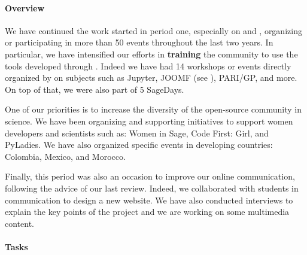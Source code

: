 \paragraph{Overview}

  We have continued the work started in period one, especially on  and
  , organizing or participating in more than 50 events throughout the last two years.
  In particular, we have intensified our efforts in \textbf{training} the community to use the tools developed through \ODK.
  Indeed we have had 14 workshops or events directly organized by \ODK on subjects such as Jupyter, JOOMF (see ), PARI/GP, and more. On top of that, we were also part of 5 SageDays.

  One of our priorities is to increase the diversity of the open-source community in science. We have been organizing
  and supporting initiatives to support women developers and scientists such as: Women in Sage, Code First: Girl, and
  PyLadies. We have also organized specific events in developing countries: Colombia, Mexico, and Morocco.

  Finally, this period was also an occasion to improve our online communication, following the advice of our last review.
  Indeed, we collaborated with students in communication to design a new website. We have also conducted interviews to explain
  the key points of the project and we are working on some multimedia content.


\paragraph{Tasks}

\subparagraph{}
\label{dissem@dissemination-communication}


